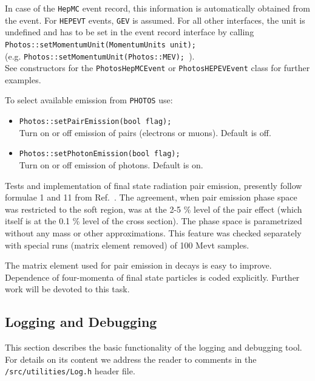 \documentclass[]{Photos_interface_design}
\begin{document}
In case of the {\tt HepMC} event record, this information is automatically obtained
from the event. For {\tt HEPEVT} events, {\tt GEV} is assumed. For all other
interfaces, the unit is undefined and has to be set in the event record
interface by calling \\ {\tt Photos::setMomentumUnit(MomentumUnits unit); }\\
(e.g. {\tt Photos::setMomentumUnit(Photos::MEV); }).
\\ See
constructors for the {\tt PhotosHepMCEvent} or {\tt PhotosHEPEVEvent} class for
further examples.

To select available emission from {\tt PHOTOS} use:

\begin{itemize}
  \item {\tt Photos::setPairEmission(bool flag); } \\
        Turn on or off emission of pairs (electrons or muons). Default is off.
  \item {\tt Photos::setPhotonEmission(bool flag); } \\
        Turn on or off emission of photons. Default is on.
\end{itemize}

Tests and implementation of final state radiation 
pair emission, presently follow formulae 1 and 11 from Ref.~\cite{Jadach:1993wk}. 
The agreement, when pair emission phase space was restricted to the soft region, was  at the   2-5 \% 
level of the pair effect (which itself is at the 0.1 \% level of the cross section). 
The phase space  is parametrized without any mass or other approximations. This feature 
was checked separately with special runs (matrix element removed) of 100 Mevt samples.

The matrix element used for pair emission in decays is easy to improve. 
Dependence of four-momenta of final state particles is coded 
explicitly. Further work \cite{Sadykov} will be devoted to this task.
\subsection{Logging and Debugging}
\label{App:Logging}
This section describes the basic functionality of the logging and debugging tool.
For details on its content we address the reader to comments in the {\tt /src/utilities/Log.h} header file.
\end{document}
